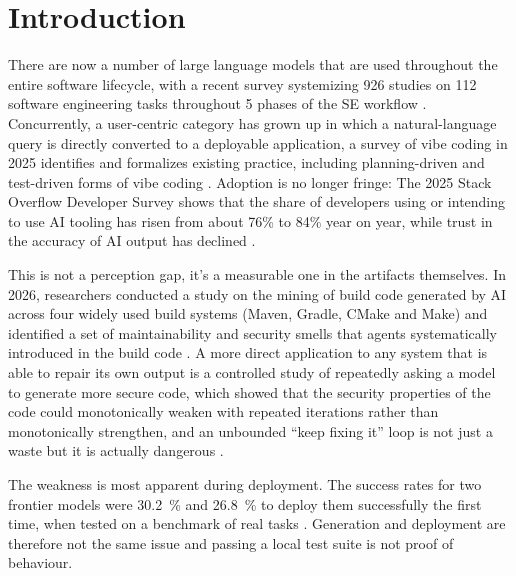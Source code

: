 \documentclass[pdflatex,sn-mathphys-num]{sn-jnl}%
\theoremstyle{thmstyleone}%
\theoremstyle{thmstyletwo}%
\theoremstyle{thmstylethree}%
\begin{document}

\maketitle

\section{Introduction}\label{sec1}

There are now a number of large language models that are used throughout the entire software lifecycle, with a recent survey systemizing 926 studies on 112 software engineering tasks throughout 5 phases of the SE workflow \cite{r01zhang}. Concurrently, a user-centric category has grown up in which a natural-language query is directly converted to a deployable application, a survey of vibe coding in 2025 identifies and formalizes existing practice, including planning-driven and test-driven forms of vibe coding \cite{r02ge}. Adoption is no longer fringe: The 2025 Stack Overflow Developer Survey shows that the share of developers using or intending to use AI tooling has risen from about 76\% to 84\% year on year, while trust in the accuracy of AI output has declined \cite{r03stackoverflow}.

This is not a perception gap, it's a measurable one in the artifacts themselves. In 2026, researchers conducted a study on the mining of build code generated by AI across four widely used build systems (Maven, Gradle, CMake and Make) and identified a set of maintainability and security smells that agents systematically introduced in the build code \cite{r04ghammam}. A more direct application to any system that is able to repair its own output is a controlled study of repeatedly asking a model to generate more secure code, which showed that the security properties of the code could monotonically weaken with repeated iterations rather than monotonically strengthen, and an unbounded ``keep fixing it'' loop is not just a waste but it is actually dangerous \cite{r05shukla}.

The weakness is most apparent during deployment. The success rates for two frontier models were 30.2~\% and 26.8~\% to deploy them successfully the first time, when tested on a benchmark of real tasks \cite{r06zhang}. Generation and deployment are therefore not the same issue and passing a local test suite is not proof of behaviour.
\end{document}
